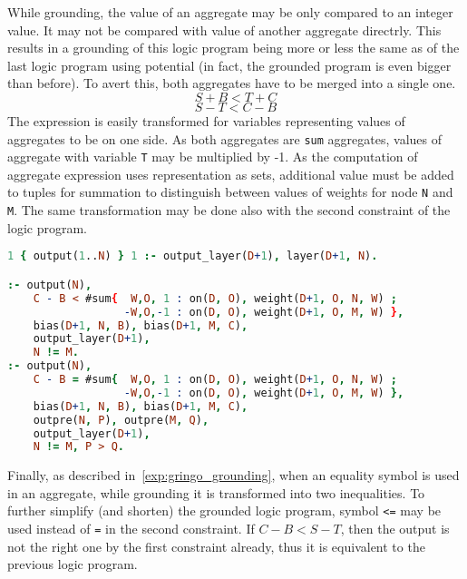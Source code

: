 While grounding, the value of an aggregate may be only compared to an integer value.
It may not be compared with value of another aggregate directrly. This results in
a grounding of this logic program being more or less the same as of the last logic program
using potential (in fact, the grounded program is even bigger than before).
To avert this, both aggregates have to be merged into a single one.
\[S + B < T + C\]
\[S - T < C - B\]
The expression is easily transformed for variables representing values of aggregates to be
on one side. As both aggregates are \texttt{sum} aggregates, values of aggregate with variable
\texttt{T} may be multiplied by -1. As the computation of aggregate expression uses
representation as sets, additional value must be added to tuples for summation to distinguish
between values of weights for node \texttt{N} and \texttt{M}.
The same transformation may be done also with the second constraint of the logic program.

\begin{code}
\begin{lstlisting}[language=Prolog, numbers=none]
1 { output(1..N) } 1 :- output_layer(D+1), layer(D+1, N).

:- output(N),
    C - B < #sum{  W,O, 1 : on(D, O), weight(D+1, O, N, W) ;
                  -W,O,-1 : on(D, O), weight(D+1, O, M, W) },
    bias(D+1, N, B), bias(D+1, M, C),
    output_layer(D+1),
    N != M.
:- output(N),
    C - B = #sum{  W,O, 1 : on(D, O), weight(D+1, O, N, W) ;
                  -W,O,-1 : on(D, O), weight(D+1, O, M, W) },
    bias(D+1, N, B), bias(D+1, M, C),
    outpre(N, P), outpre(M, Q),
    output_layer(D+1),
    N != M, P > Q.
\end{lstlisting}
    \nobreak{}\label{enc:argmax_direct_eq}
\end{code}

Finally, as described in~\cref{exp:gringo_grounding}, when an equality symbol is used
in an aggregate, while grounding it is transformed into two inequalities.
To further simplify (and shorten) the grounded logic program, symbol \texttt{<=}
may be used instead of \texttt{=} in the second constraint.
If $C-B < S-T$, then the output is not the right one by the first constraint already,
thus it is equivalent to the previous logic program.

